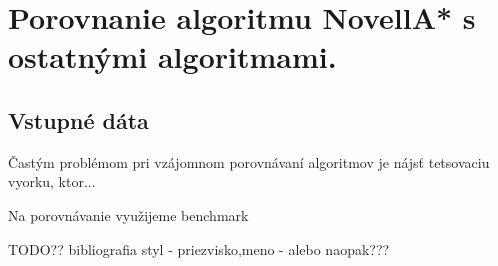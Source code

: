 \chapter{Porovnanie algoritmu NovellA* s ostatnými algoritmami.}

\section{Vstupné dáta}
Častým problémom pri vzájomnom porovnávaní algoritmov je
nájsť tetsovaciu vyorku, ktor... \cite{sturtevant2012benchmarks}


Na porovnávanie využijeme benchmark

TODO?? bibliografia styl - priezvisko,meno - alebo naopak???